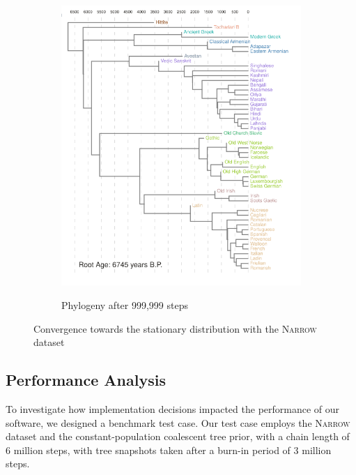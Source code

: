 \documentclass[10pt,journal,compsoc]{IEEEtran}
\begin{document}
\begin{figure}
\begin{subfigure}[b]{0.4\paperwidth}
         \label{fig:five over x}
     \end{subfigure}
     \hfill
     \begin{subfigure}[b]{0.4\paperwidth}
         \centering
         \caption{Phylogeny after 999,999 steps}
         \includegraphics[width=\textwidth]{runs26-conv4}
         \label{fig:five over x}
     \end{subfigure}
     \caption{Convergence towards the stationary distribution with the \textsc{Narrow} dataset}
     \label{fig:convtrees}
\end{figure}

\subsection{Performance Analysis}

To investigate how implementation decisions impacted the performance of our software, we designed a benchmark test case. Our test case employs the \textsc{Narrow} dataset and the constant-population coalescent tree prior, with a chain length of 6 million steps, with tree snapshots taken after a burn-in period of 3 million steps.
\end{document}
